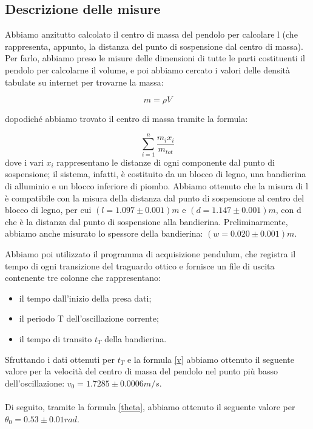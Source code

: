 \documentclass{article}
\begin{document}
\FloatBarrier

\vspace{1em}

\subsection{Descrizione delle misure}
Abbiamo anzitutto calcolato il centro di massa del pendolo per calcolare l (che rappresenta, appunto, la distanza del punto di sospensione dal centro di massa). Per farlo, abbiamo preso le misure delle dimensioni di tutte le parti costituenti il pendolo per calcolarne il volume, e poi abbiamo cercato i valori delle densità tabulate su internet per trovarne la massa:

\begin{equation*}
    m = \rho V
\end{equation*}

dopodiché abbiamo trovato il centro di massa tramite la formula:

\begin{equation*}
    \sum_{i = 1}^{n}\frac{m_i x_i}{m_{tot}}
\end{equation*}
 dove i vari $x_i$ rappresentano le distanze di ogni componente dal punto di sospensione; il sistema, infatti, è costituito da un blocco di legno, una bandierina di alluminio e un blocco inferiore di piombo. Abbiamo ottenuto che la misura di l è compatibile con la misura della distanza dal punto di sospensione al centro del blocco di legno, per cui $(l = 1.097 \pm 0.001)m$ e $(d = 1.147 \pm 0.001)m$, con d che è la distanza dal punto di sospensione alla bandierina. Preliminarmente, abbiamo anche misurato lo spessore della bandierina: $(w = 0.020 \pm 0.001)m$.
 
Abbiamo poi utilizzato il programma di acquisizione pendulum, che
registra il tempo di ogni transizione del traguardo ottico e fornisce un file di uscita contenente tre colonne che rappresentano:
\begin{itemize}
    \item il tempo dall'inizio della presa dati;
    \item il periodo T dell'oscillazione corrente;
    \item il tempo di transito $t_T$ della bandierina.
\end{itemize}

Sfruttando i dati ottenuti per $t_T$ e la formula \eqref{v} abbiamo ottenuto il seguente valore per la velocità del centro di massa del pendolo nel punto più basso dell'oscillazione: $v_0 = 1.7285 \pm 0.0006 m/s$.\\
\\
Di seguito, tramite la formula \eqref{theta}, abbiamo ottenuto il seguente valore per $\theta_0 = 0.53 \pm 0.01 rad$.
\end{document}
